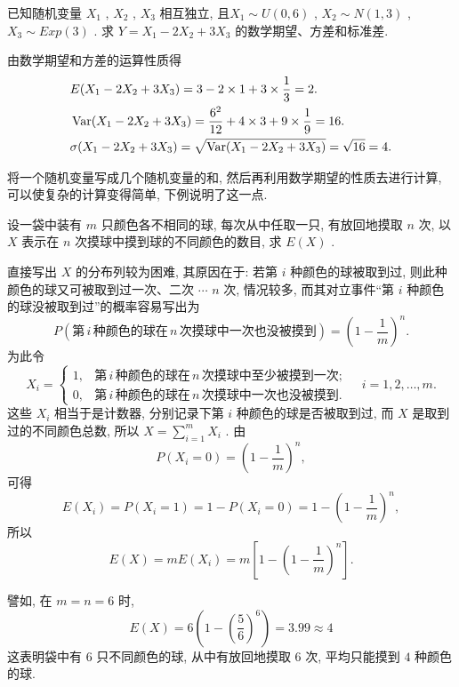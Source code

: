   \begin{example}\label{exam:3.4.3}
  	已知随机变量 $X_1$ , $X_2$ , $X_3$ 相互独立, 且$X_1 \sim U(0,6)$ , $X_2 \sim N(1,3)$ , $X_3 \sim Exp(3)$ . 求 $Y=X_1-2X_2+3X_3$ 的数学期望、方差和标准差.
  	\begin{solution}
  		由数学期望和方差的运算性质得
  		\begin{align*}
  			&E(X_1-2X_2+3X_3)=3 - 2\times1 + 3\times\frac{1}{3}=2.\\
  			&\operatorname{Var}(X_1-2X_2+3X_3)=\frac{6^2}{12}+4\times3+9\times\frac{1}{9}=16.\\
  			&\sigma(X_1-2X_2+3X_3)=\sqrt{\operatorname{Var}(X_1-2X_2+3X_3)}=\sqrt{16}=4.
  		\end{align*}
  	\end{solution}
  \end{example}
  将一个随机变量写成几个随机变量的和, 然后再利用数学期望的性质去进行计算, 可以使复杂的计算变得简单, 下例说明了这一点.
  \begin{example}\label{exam:3.4.4}
  	设一袋中装有 $m$ 只颜色各不相同的球, 每次从中任取一只, 有放回地摸取 $n$ 次, 以 $X$ 表示在 $n$ 次摸球中摸到球的不同颜色的数目, 求 $E(X)$ .
  	\begin{solution}
  		直接写出 $X$ 的分布列较为困难, 其原因在于: 若第 $i$ 种颜色的球被取到过, 则此种颜色的球又可被取到过一次、二次 $\cdots$ $n$ 次, 情况较多, 而其对立事件“第 $i$ 种颜色的球没被取到过”的概率容易写出为
  		\begin{equation*}
  			P(\text{第}\,i\,\text{种颜色的球在}\,n\,\text{次摸球中一次也没被摸到})=\left( 1-\frac{1}{m} \right)^n.
  		\end{equation*}
  		为此令
  		\begin{equation*}
  			X_i=
  			\begin{cases}
  			1, & \text{第}\,i\,\text{种颜色的球在}\,n\,\text{次摸球中至少被摸到一次};\\
  			0, & \text{第}\,i\,\text{种颜色的球在}\,n\,\text{次摸球中一次也没被摸到}.
  			\end{cases}\quad
  			i=1,2,\ldots,m.
  		\end{equation*}
  		这些 $X_i$ 相当于是计数器, 分别记录下第 $i$ 种颜色的球是否被取到过, 而 $X$ 是取到过的不同颜色总数, 所以 $X=\sum_{i=1}^{m}X_i$ . 由
  		\begin{equation*}
  			P\left(X_{i}=0\right)=\left(1-\frac{1}{m}\right)^{n},
  		\end{equation*}
  		可得
  		\begin{equation*}
  			E\left(X_{i}\right)=P\left(X_{i}=1\right)=1-P\left(X_{i}=0\right)=1-\left(1-\frac{1}{m}\right)^{n},
  		\end{equation*}
  		所以
  		\begin{equation*}
  			E(X)=m E\left(X_{i}\right)=m\left[1-\left(1-\frac{1}{m}\right)^{n}\right].
  		\end{equation*}
  	\end{solution}
  譬如, 在 $m=n=6$ 时,
  \begin{equation*}
  	E(X)=6\left(1-\left(\frac{5}{6}\right)^{6}\right)=3.99 \approx 4
  \end{equation*} 
  这表明袋中有 $6$ 只不同颜色的球, 从中有放回地摸取 $6$ 次, 平均只能摸到 $4$ 种颜色的球.
  \end{example}
